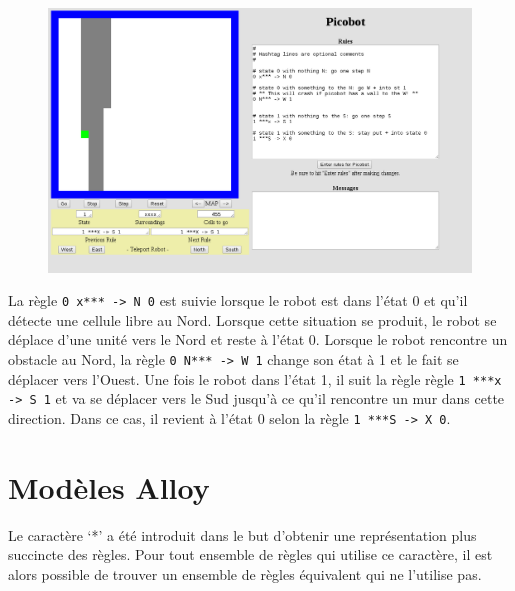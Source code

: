 \documentclass{article}
\begin{document}
\begin{figure}[H]
 \centerline{\includegraphics[scale=0.45]{pictures/Image1.png}}
 
 \end{figure}

La règle \texttt{0 x*** -> N 0} est suivie lorsque le robot est dans l'état 0 et qu'il détecte une cellule libre au Nord. Lorsque cette situation se produit, le robot se déplace d'une unité vers le Nord et reste à l'état 0. Lorsque le robot rencontre un obstacle au Nord, la règle \texttt{0 N*** -> W 1} change son état à 1 et le fait se déplacer vers l’Ouest. Une fois le robot dans l'état 1, il suit la règle règle \texttt{1 ***x -> S 1} et va se déplacer vers le Sud jusqu'à ce qu'il rencontre un mur dans cette direction. Dans ce cas, il revient à l'état 0 selon la règle \texttt{1 ***S -> X 0}.

\section{Modèles Alloy}
\label{sec:mod_alloy}
Le caractère ‘*’ a été introduit dans le but d’obtenir une représentation plus succincte des règles. Pour tout ensemble de règles qui utilise ce caractère, il est alors possible de trouver un ensemble de règles équivalent qui ne l’utilise pas.

\begin{figure}[H]
\end{figure}
\end{document}
